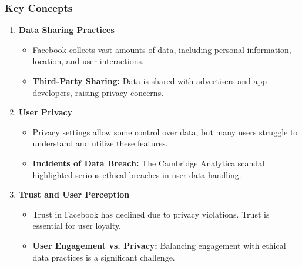 \documentclass[aspectratio=169]{beamer}
\begin{document}
\begin{frame}[fragile]
    \frametitle{Key Concepts}
    \begin{enumerate}
        \item \textbf{Data Sharing Practices}
        \begin{itemize}
            \item Facebook collects vast amounts of data, including personal information, location, and user interactions.
            \item \textbf{Third-Party Sharing:} Data is shared with advertisers and app developers, raising privacy concerns.
        \end{itemize}
        
        \item \textbf{User Privacy}
        \begin{itemize}
            \item Privacy settings allow some control over data, but many users struggle to understand and utilize these features.
            \item \textbf{Incidents of Data Breach:} The Cambridge Analytica scandal highlighted serious ethical breaches in user data handling.
        \end{itemize}
        
        \item \textbf{Trust and User Perception}
        \begin{itemize}
            \item Trust in Facebook has declined due to privacy violations. Trust is essential for user loyalty.
            \item \textbf{User Engagement vs. Privacy:} Balancing engagement with ethical data practices is a significant challenge.
        \end{itemize}
    \end{enumerate}
\end{frame}
\end{document}
